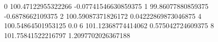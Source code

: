 0 100.47122955322266 -0.07741546630859375
1 99.86077880859375 -0.6878662109375
2 100.59087371826172 0.04222869873046875
4 100.54864501953125 0.0
6 101.12368774414062 0.575042724609375
8 101.75841522216797 1.2097702026367188
